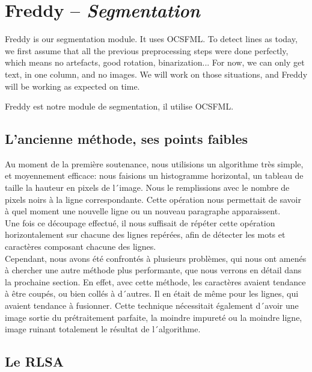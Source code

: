 \chapter{Freddy -- \emph{Segmentation}}

Freddy is our segmentation module. It uses OCSFML.
To detect lines as today, we first assume that all the previous preprocessing steps were done perfectly, which means no artefacts, good rotation, binarization... For now, we can only get text, in one column, and no images. We will work on those situations, and Freddy will be working as expected on time.

Freddy est notre module de segmentation, il utilise OCSFML.

\section{L'ancienne méthode, ses points faibles}

Au moment de la première soutenance, nous utilisions un algorithme très simple, et moyennement efficace: nous faisions un histogramme horizontal, un tableau de taille la hauteur en pixels de l´image. Nous le remplissions avec le nombre de pixels noirs à la ligne correspondante. Cette opération nous permettait de savoir à quel moment une nouvelle ligne ou un nouveau paragraphe apparaissent.\\
Une fois ce découpage effectué, il nous suffisait de répéter cette opération horizontalement sur chacune des lignes repérées, afin de détecter les mots et caractères composant chacune des lignes.\\
Cependant, nous avons été confrontés à plusieurs problèmes, qui nous ont amenés à chercher une autre méthode plus performante, que nous verrons en détail dans la prochaine section. En effet, avec cette méthode, les caractères avaient tendance à être coupés, ou bien collés à d´autres. Il en était de même pour les lignes, qui avaient tendance à fusionner. Cette technique nécessitait également d´avoir une image sortie du prétraitement parfaite, la moindre impureté ou la moindre ligne, image ruinant totalement le résultat de l´algorithme.

\section{Le RLSA}

